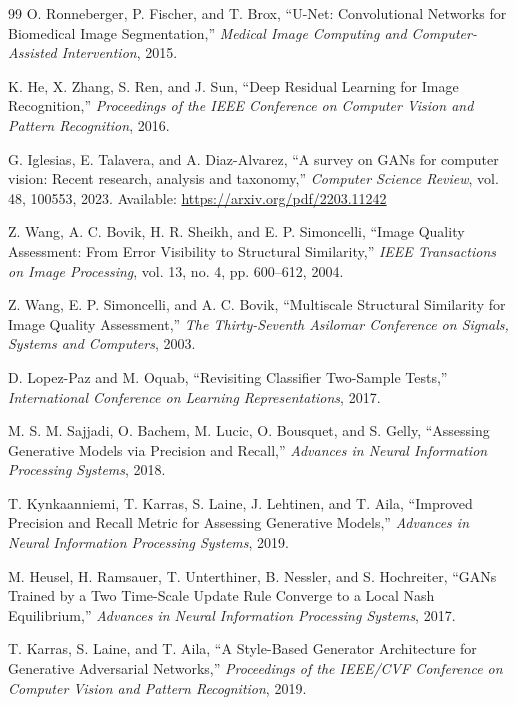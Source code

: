 \documentclass[conference]{IEEEtran}
\begin{document}
\begin{thebibliography}{99}
O. Ronneberger, P. Fischer, and T. Brox, ``U-Net: Convolutional Networks for Biomedical Image Segmentation,'' \emph{Medical Image Computing and Computer-Assisted Intervention}, 2015.

K. He, X. Zhang, S. Ren, and J. Sun, ``Deep Residual Learning for Image Recognition,'' \emph{Proceedings of the IEEE Conference on Computer Vision and Pattern Recognition}, 2016.

G. Iglesias, E. Talavera, and A. Diaz-Alvarez, ``A survey on GANs for computer vision: Recent research, analysis and taxonomy,'' \emph{Computer Science Review}, vol. 48, 100553, 2023. Available: \url{https://arxiv.org/pdf/2203.11242}

Z. Wang, A. C. Bovik, H. R. Sheikh, and E. P. Simoncelli, ``Image Quality Assessment: From Error Visibility to Structural Similarity,'' \emph{IEEE Transactions on Image Processing}, vol. 13, no. 4, pp. 600--612, 2004.

Z. Wang, E. P. Simoncelli, and A. C. Bovik, ``Multiscale Structural Similarity for Image Quality Assessment,'' \emph{The Thirty-Seventh Asilomar Conference on Signals, Systems and Computers}, 2003.

D. Lopez-Paz and M. Oquab, ``Revisiting Classifier Two-Sample Tests,'' \emph{International Conference on Learning Representations}, 2017.

M. S. M. Sajjadi, O. Bachem, M. Lucic, O. Bousquet, and S. Gelly, ``Assessing Generative Models via Precision and Recall,'' \emph{Advances in Neural Information Processing Systems}, 2018.

T. Kynkaanniemi, T. Karras, S. Laine, J. Lehtinen, and T. Aila, ``Improved Precision and Recall Metric for Assessing Generative Models,'' \emph{Advances in Neural Information Processing Systems}, 2019.

M. Heusel, H. Ramsauer, T. Unterthiner, B. Nessler, and S. Hochreiter, ``GANs Trained by a Two Time-Scale Update Rule Converge to a Local Nash Equilibrium,'' \emph{Advances in Neural Information Processing Systems}, 2017.

T. Karras, S. Laine, and T. Aila, ``A Style-Based Generator Architecture for Generative Adversarial Networks,'' \emph{Proceedings of the IEEE/CVF Conference on Computer Vision and Pattern Recognition}, 2019.

\end{thebibliography}
\end{document}
